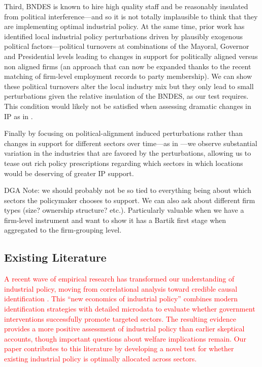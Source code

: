 \documentclass{article}
\begin{document}
Third, BNDES is known to hire high quality staff and be reasonably insulated from political interference---and so it is not totally implausible to think that they are implementing optimal industrial policy. At the same time, prior work has identified local industrial policy perturbations driven by plausibly exogenous political factors---political turnovers at combinations of the Mayoral, Governor and Presidential levels leading to changes in support for politically aligned versus non aligned firms (an approach that can now be expanded thanks to the recent matching of firm-level employment records to party membership). We can show these political turnovers alter the local industry mix but they only lead to small perturbations given the relative insulation of the BNDES, as our test requires. This condition would likely not be satisfied when assessing dramatic changes in IP as in \citet{lane2025manufacturing}.

Finally by focusing on political-alignment induced perturbations rather than changes in support for different sectors over time---as in \citet{lane2025manufacturing}---we observe substantial variation in the industries that are favored by the perturbations, allowing us to tease out rich policy prescriptions regarding which sectors in which locations would be deserving of greater IP support.

DGA Note: we should probably not be so tied to everything being about which sectors the policymaker chooses to support. We can also ask about different firm types (size? ownership structure? etc.). Particularly valuable when we have a firm-level instrument and want to show it has a Bartik first stage when aggregated to the firm-grouping level.

\subsection{Existing Literature}

\textcolor{red}{A recent wave of empirical research has transformed our understanding of industrial policy, moving from correlational analysis toward credible causal identification \citep{juhasz2024new}. This ``new economics of industrial policy'' combines modern identification strategies with detailed microdata to evaluate whether government interventions successfully promote targeted sectors. The resulting evidence provides a more positive assessment of industrial policy than earlier skeptical accounts, though important questions about welfare implications remain. Our paper contributes to this literature by developing a novel test for whether existing industrial policy is optimally allocated across sectors.}
\end{document}
